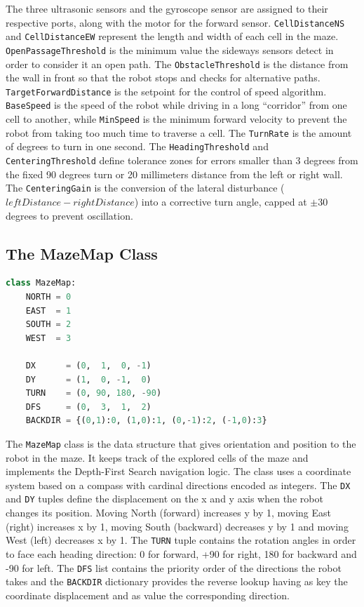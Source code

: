 The three ultrasonic sensors and the gyroscope sensor are assigned to their respective ports, along with the motor for the forward sensor. \texttt{CellDistanceNS} and \texttt{CellDistanceEW} represent the length and width of each cell in the maze. 
\texttt{OpenPassageThreshold} is the minimum value the sideways sensors detect in order to consider it an open path. The \texttt{ObstacleThreshold} is the distance from the wall in front so that the robot stops and checks for alternative paths. \texttt{TargetForwardDistance} is the setpoint for the control of speed algorithm. 
\texttt{BaseSpeed} is the speed of the robot while driving in a long ``corridor'' from one cell to another, while \texttt{MinSpeed} is the minimum forward velocity to prevent the robot from taking too much time to traverse a cell. The \texttt{TurnRate} is the amount of degrees to turn in one second. The \texttt{HeadingThreshold} and \texttt{CenteringThreshold} define tolerance zones for errors smaller than 3 degrees from the fixed 90 degrees turn or 20 millimeters distance from the left or right wall. The \texttt{CenteringGain} is the conversion of the lateral disturbance ($leftDistance - rightDistance$) into a corrective turn angle, capped at $\pm30$ degrees to prevent oscillation.

\subsection{The MazeMap Class}
\label{sec:mazemap}

\begin{lstlisting}[language=Python, caption={MazeMap attributes}, label={lst:lk-init}]
class MazeMap:
    NORTH = 0
    EAST  = 1
    SOUTH = 2
    WEST  = 3

    DX      = (0,  1,  0, -1)         
    DY      = (1,  0, -1,  0)          
    TURN    = (0, 90, 180, -90)        
    DFS     = (0,  3,  1,  2)          
    BACKDIR = {(0,1):0, (1,0):1, (0,-1):2, (-1,0):3}
\end{lstlisting}

The \texttt{MazeMap} class is the data structure that gives orientation and position to the robot in the maze. It keeps track of the explored cells of the maze and implements the Depth-First Search navigation logic. The class uses a coordinate system based on a compass with cardinal directions encoded as integers. The \texttt{DX} and \texttt{DY} tuples define the displacement on the x and y axis when the robot changes its position. Moving North (forward) increases y by 1, moving East (right) increases x by 1, moving South (backward) decreases y by 1 and moving West (left) decreases x by 1. The \texttt{TURN} tuple contains the rotation angles in order to face each heading direction: 0 for forward, +90 for right, 180 for backward and -90 for left. The \texttt{DFS} list contains the priority order of the directions the robot takes and the \texttt{BACKDIR} dictionary provides the reverse lookup having as key the coordinate displacement and as value the corresponding direction. 

